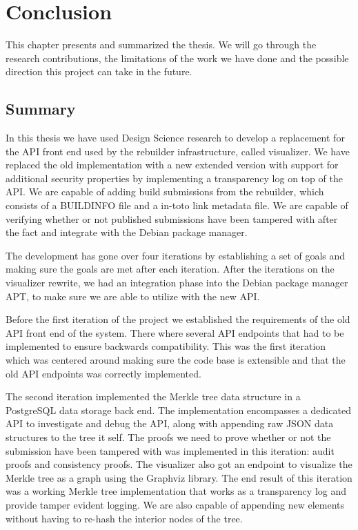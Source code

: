 \documentclass[../Main/thesis.tex]{subfiles}
\begin{document}
\chapter{Conclusion}%
\label{ch:conclusion}
This chapter presents and summarized the thesis. We will go through the research
contributions, the limitations of the work we have done and the possible
direction this project can take in the future.

\section{Summary}%
\label{sec:summary}
In this thesis we have used Design Science research to develop a replacement for
the API front end used by the rebuilder infrastructure, called visualizer. We
have replaced the old implementation with a new extended version with support
for additional security properties by implementing a transparency log on top of
the API. We are capable of adding build submissions from the rebuilder, which
consists of a BUILDINFO file and a in-toto link metadata file. We are capable of
verifying whether or not published submissions have been tampered with after the
fact and integrate with the Debian package manager.

The development has gone over four iterations by establishing a set of
goals and making sure the goals are met after each iteration. After the
iterations on the visualizer rewrite, we had an integration phase into the
Debian package manager APT, to make sure we are able to utilize with the new
API.

Before the first iteration of the project we established the requirements of the
old API front end of the system. There where several API endpoints that had to be
implemented to ensure backwards compatibility. This was the first iteration
which was centered around making sure the code base is extensible and that the
old API endpoints was correctly implemented.

The second iteration implemented the Merkle tree data structure in a PostgreSQL
data storage back end. The implementation encompasses a dedicated API to
investigate and debug the API, along with appending raw JSON data structures to
the tree it self. The proofs we need to prove whether or not the submission have
been tampered with was implemented in this iteration: audit proofs and
consistency proofs. The visualizer also got an endpoint to visualize the Merkle
tree as a graph using the Graphviz library. The end result of this iteration was
a working Merkle tree implementation that works as a transparency log and
provide tamper evident logging. We are also capable of appending new elements
without having to re-hash the interior nodes of the tree.
\end{document}
